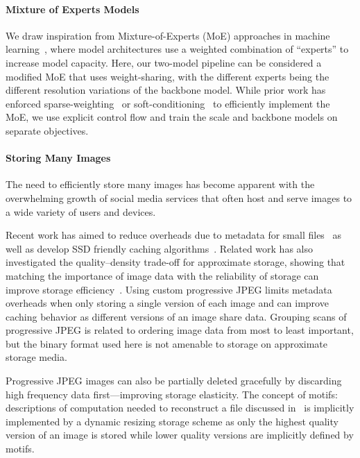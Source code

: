 \paragraph{Mixture of Experts Models}
We draw inspiration from Mixture-of-Experts (MoE) approaches in machine learning~\cite{jacobs1991adaptive, shazeer2017outrageously, yang2019soft, lepikhin2020gshard}, where model architectures use a weighted combination of ``experts'' to increase model capacity.
Here, our two-model pipeline can be considered a modified MoE that uses weight-sharing, with the different experts being the different resolution variations of the backbone model.
While prior work has enforced sparse-weighting~\cite{shazeer2017outrageously} or soft-conditioning~\cite{yang2019soft} to efficiently implement the MoE, we use explicit control flow and train the scale and backbone models on separate objectives.


\paragraph{Storing Many Images}
The need to efficiently store many images has become apparent with the overwhelming growth of social media services that often host and serve images to a wide variety of users and devices.

Recent work has aimed to reduce overheads due to metadata for small files~\cite{beaver2010finding} as well as develop SSD friendly caching algorithms~\cite{tang2015ripq}. 
Related work has also investigated the quality--density trade-off for approximate storage, showing that matching the importance of image data with the reliability of storage can improve storage efficiency~\cite{guo2016high}. 
Using custom progressive JPEG limits metadata overheads when only storing a single version of each image and can improve caching behavior as different versions of an image share data.
Grouping scans of progressive JPEG is related to ordering image data from most to least important, but the binary format used here is not amenable to storage on approximate storage media.

Progressive JPEG images can also be partially deleted gracefully by discarding high frequency data first---improving storage elasticity.
The concept of motifs: descriptions of computation needed to reconstruct a file discussed in~\cite{183605, carillon} is implicitly implemented by a dynamic resizing storage scheme as only the highest quality version of an image is stored while lower quality versions are implicitly defined by motifs.

